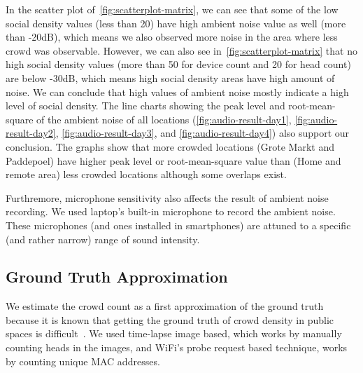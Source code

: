 	In the scatter plot of~\autoref{fig:scatterplot-matrix}, we can see that some of the low social density values (less than 20) have high ambient noise value as well (more than -20dB), which means we also observed more noise in the area where less crowd was observable. However, we can also see in~\autoref{fig:scatterplot-matrix} that no high social density values (more than 50 for device count and 20 for head count) are below -30dB, which means high social density areas have high amount of noise. We can conclude that high values of ambient noise mostly indicate a high level of social density. The line charts showing the peak level and root-mean-square of the ambient noise of all locations (\autoref{fig:audio-result-day1}, \autoref{fig:audio-result-day2}, \autoref{fig:audio-result-day3}, and \autoref{fig:audio-result-day4}) also support our conclusion. The graphs show that more crowded locations (Grote Markt and Paddepoel) have higher peak level or root-mean-square value than (Home and remote area) less crowded locations although some overlaps exist.

	Furthremore, microphone sensitivity also affects the result of ambient noise recording. We used laptop's built-in microphone to record the ambient noise. These microphones (and ones installed in smartphones) are attuned to a specific (and rather narrow) range of sound intensity.



	\subsection{Ground Truth Approximation} %
	\label{sub:ground_truth_approximation}
	We estimate the crowd count as a first approximation of the ground truth because it is known that getting the ground truth of crowd density in public spaces is difficult~\cite{thesis041}. We used time-lapse image based, which works by manually counting heads in the images, and WiFi's probe request based technique, works by counting unique \ac{MAC} addresses.

